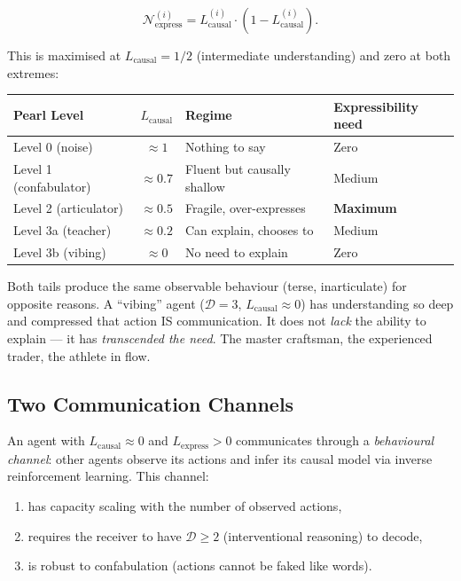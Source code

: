 \begin{definition}
\label{def:horseshoe}
\begin{equation}
    \mathcal{N}_{\text{express}}^{(i)} = L_{\text{causal}}^{(i)} \cdot (1 - L_{\text{causal}}^{(i)}).
\end{equation}
\end{definition}

This is maximised at $L_{\text{causal}} = 1/2$ (intermediate understanding) and zero at both extremes:

\begin{center}
\renewcommand{\arraystretch}{1.3}
\begin{tabular}{lcll}
\hline
\textbf{Pearl Level} & $L_{\text{causal}}$ & \textbf{Regime} & \textbf{Expressibility need} \\
\hline
Level 0 (noise) & $\approx 1$ & Nothing to say & Zero \\
Level 1 (confabulator) & $\approx 0.7$ & Fluent but causally shallow & Medium \\
Level 2 (articulator) & $\approx 0.5$ & Fragile, over-expresses & \textbf{Maximum} \\
Level 3a (teacher) & $\approx 0.2$ & Can explain, chooses to & Medium \\
Level 3b (vibing) & $\approx 0$ & No need to explain & Zero \\
\hline
\end{tabular}
\end{center}

Both tails produce the same observable behaviour (terse, inarticulate) for opposite reasons. A ``vibing'' agent ($\mathcal{D} = 3$, $L_{\text{causal}} \approx 0$) has understanding so deep and compressed that action IS communication. It does not \emph{lack} the ability to explain --- it has \emph{transcended the need}. The master craftsman, the experienced trader, the athlete in flow.


\subsection{Two Communication Channels}

\begin{proposition}
\label{prop:tacit-channel}
An agent with $L_{\text{causal}} \approx 0$ and $L_{\text{express}} > 0$ communicates through a \emph{behavioural channel}: other agents observe its actions and infer its causal model via inverse reinforcement learning. This channel:
\begin{enumerate}[label=(\roman*)]
    \item has capacity scaling with the number of observed actions,
    \item requires the receiver to have $\mathcal{D} \geq 2$ (interventional reasoning) to decode,
    \item is robust to confabulation (actions cannot be faked like words).
\end{enumerate}
\end{proposition}

